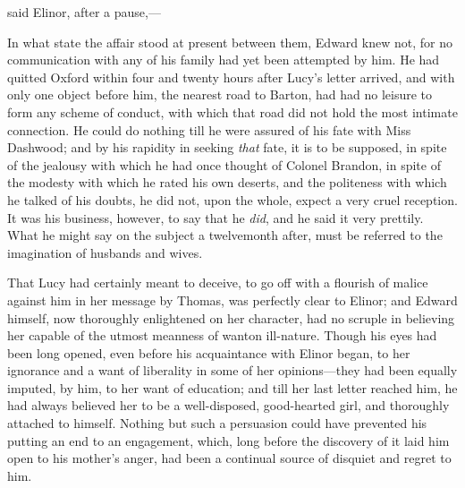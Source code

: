  said Elinor, after a pause,---


In what state the affair stood at present between them, Edward knew not, for no communication with any of his family had yet been attempted by him. He had quitted Oxford within four and twenty hours after Lucy's letter arrived, and with only one object before him, the nearest road to Barton, had had no leisure to form any scheme of conduct, with which that road did not hold the most intimate connection. He could do nothing till he were assured of his fate with Miss Dashwood; and by his rapidity in seeking {\em that} fate, it is to be supposed, in spite of the jealousy with which he had once thought of Colonel Brandon, in spite of the modesty with which he rated his own deserts, and the politeness with which he talked of his doubts, he did not, upon the whole, expect a very cruel reception. It was his business, however, to say that he {\em did}, and he said it very prettily. What he might say on the subject a twelvemonth after, must be referred to the imagination of husbands and wives.

That Lucy had certainly meant to deceive, to go off with a flourish of malice against him in her message by Thomas, was perfectly clear to Elinor; and Edward himself, now thoroughly enlightened on her character, had no scruple in believing her capable of the utmost meanness of wanton ill-nature. Though his eyes had been long opened, even before his acquaintance with Elinor began, to her ignorance and a want of liberality in some of her opinions---they had been equally imputed, by him, to her want of education; and till her last letter reached him, he had always believed her to be a well-disposed, good-hearted girl, and thoroughly attached to himself. Nothing but such a persuasion could have prevented his putting an end to an engagement, which, long before the discovery of it laid him open to his mother's anger, had been a continual source of disquiet and regret to him.

